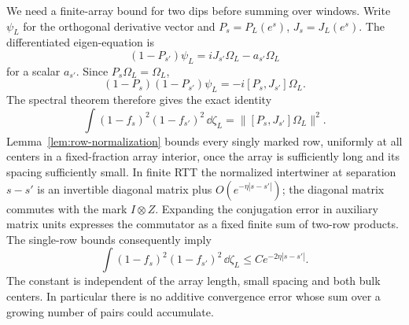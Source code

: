 We need a finite-array bound for two dips before summing over windows.
Write \(\psi_L\) for the orthogonal derivative vector and
\(P_s=P_L(e^s)\), \(J_s=J_L(e^s)\). The differentiated eigen-equation is
\[
 (1-P_{s'})\psi_L=iJ_{s'}\Omega_L-a_{s'}\Omega_L
\]
for a scalar \(a_{s'}\). Since \(P_s\Omega_L=\Omega_L\),
\[
 (1-P_s)(1-P_{s'})\psi_L=-i[P_s,J_{s'}]\Omega_L.
\]
The spectral theorem therefore gives the exact identity
\[
 \int(1-f_s)^2(1-f_{s'})^2\,\dd\zeta_L
       =\|[P_s,J_{s'}]\Omega_L\|^2.
\]
Lemma~\ref{lem:row-normalization} bounds every singly marked row,
uniformly at all centers in a fixed-fraction array interior, once the
array is sufficiently long and its spacing sufficiently small.
In finite RTT the normalized intertwiner at separation \(s-s'\)
is an invertible diagonal matrix plus
\(O(e^{-\eta|s-s'|})\); the diagonal matrix commutes with the mark
\(I\otimes Z\). Expanding the conjugation error in auxiliary matrix
units expresses the commutator as a fixed finite sum of two-row products.
The single-row bounds consequently imply
\begin{equation}\label{eq:finite-two-dip}
 \int(1-f_s)^2(1-f_{s'})^2\,\dd\zeta_L
       \le C e^{-2\eta|s-s'|}.
\end{equation}
The constant is independent of the array length, small spacing and both
bulk centers. In particular there is no additive convergence error whose
sum over a growing number of pairs could accumulate.

